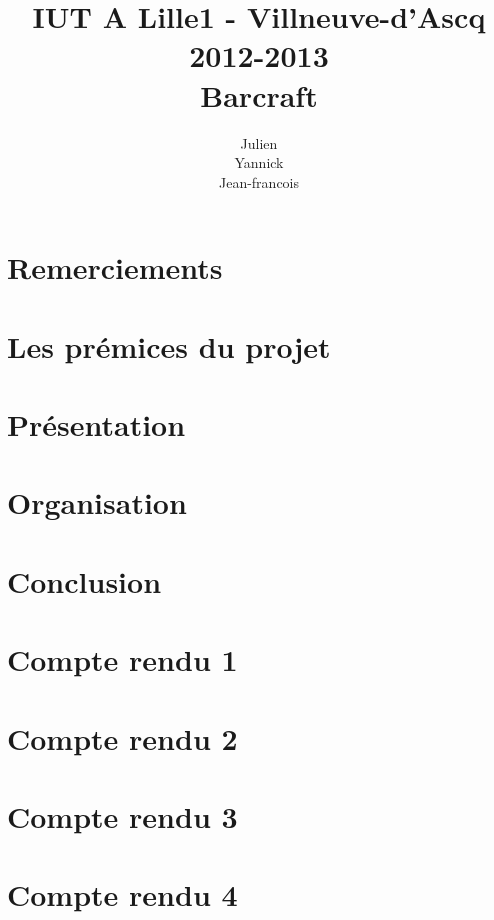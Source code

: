 \documentclass[11pt,a4paper]{report}
\title
{
	\normalsize{IUT A Lille1 - Villneuve-d'Ascq\\
	2012-2013}\\
	\vspace{15mm}
  \Huge{Barcraft
    \vspace{15mm}}
}
\author{
\bsc{Stechele} Julien\\
\bsc{Vanuxem} Yannick\\
\bsc{Serir} Jean-francois\\
	\vspace{30mm}
}
\begin{document}

\maketitle
\tableofcontents
\newpage

\chapter{Remerciements}%
\label{cha:remerciements}



\chapter{Les prémices du projet}%
\label{cha:les_pr_mices_du_projet}



\chapter{Présentation}%
\label{cha:presentation}



\chapter{Organisation}%
\label{cha:organisation}




\chapter{Conclusion}%
\label{cha:conclusion}




\appendix

\chapter{Compte rendu 1}%
\label{cha:compte_rendu_1}



\chapter{Compte rendu 2}%
\label{cha:compte_rendu_2}



\chapter{Compte rendu 3}%
\label{cha:compte_rendu_3}



\chapter{Compte rendu 4}%
\label{cha:compte_rendu_4}



\end{document}
